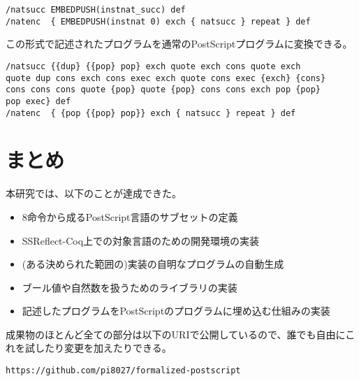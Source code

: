 \documentclass[a4paper, 10.5pt, twocolumn]{ujarticle}
\begin{document}
\begin{lstlisting}[style=plain, label=listing:embed_example, caption=PostScriptへの埋め込みの例]
/natsucc EMBEDPUSH(instnat_succ) def
/natenc  { EMBEDPUSH(instnat 0) exch { natsucc } repeat } def
\end{lstlisting}

この形式で記述されたプログラムを通常のPostScriptプログラムに変換できる。

\begin{lstlisting}[style=plain, label=listing:embed_example_converted, caption=リスト\ref{listing:embed_example}を変換して得られるプログラム]
/natsucc {{dup} {{pop} pop} exch quote exch cons quote exch
quote dup cons exch cons exec exch quote cons exec {exch} {cons}
cons cons cons quote {pop} quote {pop} cons cons exch pop {pop}
pop exec} def
/natenc  { {pop {{pop} pop}} exch { natsucc } repeat } def
\end{lstlisting}

\section*{まとめ}

本研究では、以下のことが達成できた。

\begin{itemize}
 \setlength{\itemsep}{0pt}
 \setlength{\parskip}{0pt}
 \item 8命令から成るPostScript言語のサブセットの定義
 \item SSReflect-Coq上での対象言語のための開発環境の実装
 \item (ある決められた範囲の)実装の自明なプログラムの自動生成
 \item ブール値や自然数を扱うためのライブラリの実装
 \item 記述したプログラムをPostScriptのプログラムに埋め込む仕組みの実装
\end{itemize}

成果物のほとんど全ての部分は以下のURIで公開しているので、誰でも自由にこれを試したり変更を加えたりできる。

\texttt{https://github.com/pi8027/formalized-postscript}
\end{document}
